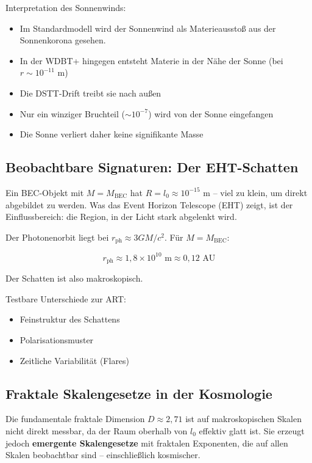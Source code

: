 \documentclass[12pt,a4paper]{article}
\begin{document}
Interpretation des Sonnenwinds:
\begin{itemize}
\item Im Standardmodell wird der Sonnenwind als Materieausstoß aus der Sonnenkorona gesehen.
\item In der WDBT+ hingegen entsteht Materie in der Nähe der Sonne (bei $r \sim 10^{-11}$ m)
\item Die DSTT-Drift treibt sie nach außen
\item Nur ein winziger Bruchteil ($\sim 10^{-7}$) wird von der Sonne eingefangen
\item Die Sonne verliert daher keine signifikante Masse
\end{itemize}

\subsection{Beobachtbare Signaturen: Der EHT-Schatten}

Ein BEC-Objekt mit $M = M_{\text{BEC}}$ hat $R = l_0 \approx 10^{-15}$ m -- viel zu klein, um direkt abgebildet zu werden. Was das Event Horizon Telescope (EHT) zeigt, ist der Einflussbereich: die Region, in der Licht stark abgelenkt wird.

Der Photonenorbit liegt bei $r_{\text{ph}} \approx 3GM/c^2$. Für $M = M_{\text{BEC}}$:

\begin{equation}
r_{\text{ph}} \approx 1,8 \times 10^{10} \text{ m} \approx 0,12 \text{ AU}
\end{equation}

Der Schatten ist also makroskopisch.

Testbare Unterschiede zur ART:
\begin{itemize}
\item Feinstruktur des Schattens
\item Polarisationsmuster
\item Zeitliche Variabilität (Flares)
\end{itemize}

\subsection{Fraktale Skalengesetze in der Kosmologie}

Die fundamentale fraktale Dimension $D \approx 2,71$ ist auf makroskopischen Skalen nicht direkt messbar, da der Raum oberhalb von $l_0$ effektiv glatt ist. Sie erzeugt jedoch \textbf{emergente Skalengesetze} mit fraktalen Exponenten, die auf allen Skalen beobachtbar sind -- einschließlich kosmischer.
\end{document}
